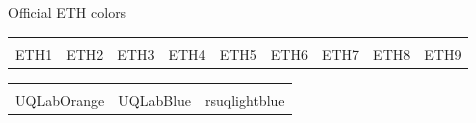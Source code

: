 \documentclass[]{rsuqbeamernew}
\begin{document}
\begin{frame}[t]{Official ETH colors}
{}\small 
\newcommand{\quadrat}{(0,0mm)--(0mm,5mm)--(5mm,5mm)--(5mm,0mm)--(0mm,0mm);}

\begin{tabular}[c]{ccccccccc}
  \begin{tikzpicture}
    {\draw[ETH1,fill=ETH1] \quadrat}
  \end{tikzpicture}
  &
  \begin{tikzpicture}
    {\draw[ETH2,fill=ETH2] \quadrat}
  \end{tikzpicture}
  &
  \begin{tikzpicture}
    {\draw[ETH3,fill=ETH3] \quadrat}
  \end{tikzpicture}
  &
  \begin{tikzpicture}
    {\draw[ETH4,fill=ETH4] \quadrat}
  \end{tikzpicture}
  &
  \begin{tikzpicture}
    {\draw[ETH5,fill=ETH5] \quadrat}
  \end{tikzpicture}
  &
  \begin{tikzpicture}
    {\draw[ETH6,fill=ETH6] \quadrat}
  \end{tikzpicture}
  &
  \begin{tikzpicture}
    {\draw[ETH7,fill=ETH7] \quadrat}
  \end{tikzpicture}
  &
  \begin{tikzpicture}
    {\draw[ETH8,fill=ETH8] \quadrat}
  \end{tikzpicture}
  &
  \begin{tikzpicture}
    {\draw[ETH9,fill=ETH9] \quadrat}
  \end{tikzpicture}
\\
ETH1 & ETH2 & ETH3 &ETH4 &ETH5 &ETH6 &ETH7 &ETH8 &ETH9
\end{tabular}

\vpcinq

\begin{tabular}[c]{ccc}
  \begin{tikzpicture}
    {\draw[UQLabOrange,fill=UQLabOrange] \quadrat}
  \end{tikzpicture}
  &
  \begin{tikzpicture}
    {\draw[UQLabBlue,fill=UQLabBlue] \quadrat}
  \end{tikzpicture} 
  &   \begin{tikzpicture}
    {\draw[rsuqlightblue,fill=rsuqlightblue] \quadrat}
  \end{tikzpicture} \\
%
UQLabOrange & UQLabBlue & rsuqlightblue 
\end{tabular}


\vpcinq


\end{frame}
\end{document}
